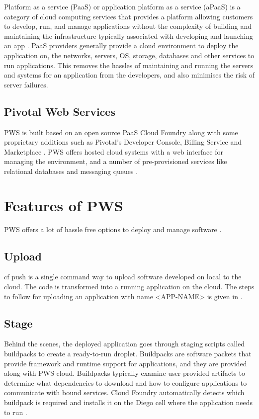 \documentclass[9pt,twocolumn,twoside]{../../styles/osajnl}
\begin{document}
Platform as a service (PaaS) or application platform as a service (aPaaS) is a category of cloud computing services that provides a platform allowing customers to develop, run, and manage applications without the complexity of building and maintaining the infrastructure typically associated with developing and launching an app \cite{www-paas-wiki}. PaaS providers generally provide a cloud environment to deploy the application on, the networks, servers, OS, storage, databases and other services to run applications. This removes the hassles of maintaining and running the servers and systems for an application from the developers, and also minimises the risk of server failures. 

\subsection{Pivotal Web Services}
PWS is built based on an open source PaaS Cloud Foundry along with some proprietary additions such as Pivotal's Developer Console, Billing Service and Marketplace \cite{www-pws-register}. PWS offers hosted cloud systems with a web interface for managing the environment, and a number of pre-provisioned services like relational databases and messaging queues \cite{www-pws-stackoverflow}. 

\section{Features of PWS}

PWS offers a lot of hassle free options to deploy and manage software \cite{www-pws-features}. 

\subsection{Upload}
cf push is a single command way to upload software developed on local to the cloud. The code is transformed into a running application on the cloud. The steps to follow for uploading an application with name <APP-NAME> is given in \cite{www-pws-push}.
\subsection{Stage}
Behind the scenes, the deployed application goes through staging scripts called buildpacks to create a ready-to-run droplet. Buildpacks are software packets that provide framework and runtime support for applications, and they are provided along with PWS cloud. Buildpacks typically examine user-provided artifacts to determine what dependencies to download and how to configure applications to communicate with bound services. Cloud Foundry automatically detects which buildpack is required and installs it on the Diego cell where the application needs to run \cite{www-pws-buildpacks}. 
\end{document}
